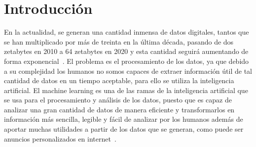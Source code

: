\documentclass[a4paper, 12pt]{book}
\begin{document}


\tableofcontents 
\cleardoublepage
\listoffigures %



\cleardoublepage
\chapter{Introducción}
\label{sec:intro} %

En la actualidad, se generan una cantidad inmensa de datos digitales, tantos que se han multiplicado por más de treinta en la última década, pasando de dos zetabytes en 2010 a 64 zetabytes en 2020 y esta cantidad seguirá aumentando de forma exponencial~\cite{Pagina_de_Datos}. 
El problema es el procesamiento de los datos, ya que debido a su complejidad los humanos no somos capaces de extraer información útil de tal cantidad de datos en un tiempo aceptable, para ello se utiliza la inteligencia artificial. 
El machine learning es una de las ramas de la inteligencia artificial que se usa para el procesamiento y análisis de los datos, puesto que es capaz de analizar una gran cantidad de datos de manera eficiente y transformarlos en información más sencilla, legible y fácil de analizar por los humanos además de aportar muchas utilidades a partir de los datos que se generan, como puede ser anuncios personalizados en internet~\cite{rouhiainen2018inteligencia}.
\end{document}

